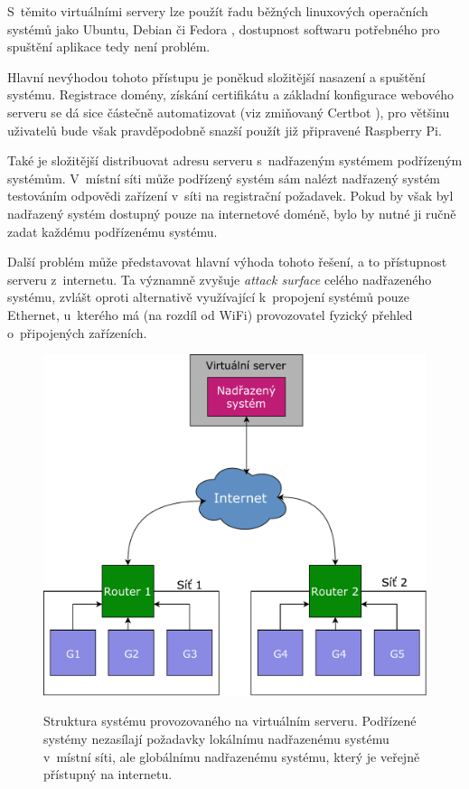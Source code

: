 S~těmito virtuálními servery lze použít řadu běžných linuxových operačních systémů jako Ubuntu, Debian či Fedora \cite{digi_droplets}, dostupnost softwaru potřebného pro spuštění aplikace tedy není problém.

Hlavní nevýhodou tohoto přístupu je poněkud složitější nasazení a spuštění systému. Registrace domény, získání certifikátu a základní konfigurace webového serveru se dá sice částečně automatizovat (viz zmiňovaný Certbot \cite{certbot}), pro většinu uživatelů bude však pravděpodobně snazší použít již připravené Raspberry Pi.

Také je složitější distribuovat adresu serveru s~nadřazeným systémem podřízeným systémům. V~místní síti může podřízený systém sám nalézt nadřazený systém testováním odpovědi zařízení v~síti na registrační požadavek. Pokud by však byl nadřazený systém dostupný pouze na internetové doméně, bylo by nutné ji ručně zadat každému podřízenému systému.

Další problém může představovat hlavní výhoda tohoto řešení, a to přístupnost serveru z~internetu. Ta významně zvyšuje \textit{attack surface} celého nadřazeného systému, zvlášt oproti alternativě využívající k~propojení systémů pouze Ethernet, u~kterého má (na rozdíl od WiFi) provozovatel fyzický přehled o~připojených zařízeních.

\begin{figure}[h!]
    \centering
    \includegraphics[width=\textwidth]{images/aws.pdf}
    \label{fig:aws}
    \caption[Struktura systému provozovaného na virtuálním serveru]{Struktura systému provozovaného na virtuálním serveru. Podřízené systémy nezasílají požadavky lokálnímu nadřazenému systému v~místní síti, ale globálnímu nadřazenému systému, který je veřejně přístupný na internetu.}
\end{figure}